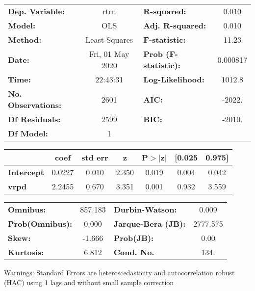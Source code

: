 \begin{center}
\begin{tabular}{lclc}
\toprule
\textbf{Dep. Variable:}    &       rtrn       & \textbf{  R-squared:         } &     0.010   \\
\textbf{Model:}            &       OLS        & \textbf{  Adj. R-squared:    } &     0.010   \\
\textbf{Method:}           &  Least Squares   & \textbf{  F-statistic:       } &     11.23   \\
\textbf{Date:}             & Fri, 01 May 2020 & \textbf{  Prob (F-statistic):} &  0.000817   \\
\textbf{Time:}             &     22:43:31     & \textbf{  Log-Likelihood:    } &    1012.8   \\
\textbf{No. Observations:} &        2601      & \textbf{  AIC:               } &    -2022.   \\
\textbf{Df Residuals:}     &        2599      & \textbf{  BIC:               } &    -2010.   \\
\textbf{Df Model:}         &           1      & \textbf{                     } &             \\
\bottomrule
\end{tabular}
\begin{tabular}{lcccccc}
                   & \textbf{coef} & \textbf{std err} & \textbf{z} & \textbf{P$> |$z$|$} & \textbf{[0.025} & \textbf{0.975]}  \\
\midrule
\textbf{Intercept} &       0.0227  &        0.010     &     2.350  &         0.019        &        0.004    &        0.042     \\
\textbf{vrpd}      &       2.2455  &        0.670     &     3.351  &         0.001        &        0.932    &        3.559     \\
\bottomrule
\end{tabular}
\begin{tabular}{lclc}
\textbf{Omnibus:}       & 857.183 & \textbf{  Durbin-Watson:     } &    0.009  \\
\textbf{Prob(Omnibus):} &   0.000 & \textbf{  Jarque-Bera (JB):  } & 2777.575  \\
\textbf{Skew:}          &  -1.666 & \textbf{  Prob(JB):          } &     0.00  \\
\textbf{Kurtosis:}      &   6.812 & \textbf{  Cond. No.          } &     134.  \\
\bottomrule
\end{tabular}
\end{center}

Warnings: \newline
 [1] Standard Errors are heteroscedasticity and autocorrelation robust (HAC) using 1 lags and without small sample correction